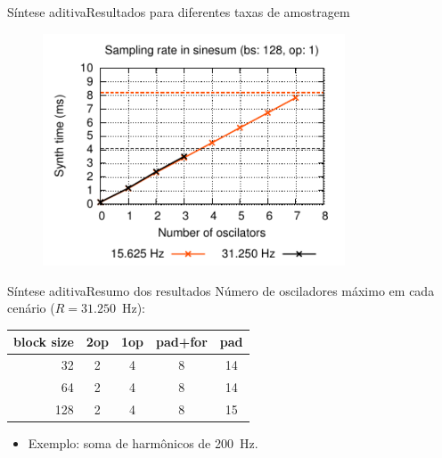 \begin{frame}{Síntese aditiva}{Resultados para diferentes taxas de amostragem}
\begin{figure}
\includegraphics[width=0.8\textwidth]{./img/frequencies-128-1.pdf}
\end{figure}
\end{frame}

\begin{frame}{Síntese aditiva}{Resumo dos resultados}
Número de osciladores máximo em cada cenário ($R=31.250$~Hz):
\begin{center}
\begin{tabular}{rcccc}
\toprule
\toprule
block size  & 2op & 1op & pad+for & pad \\
\midrule
32  & 2 & 4 & 8 & 14 \\
64  & 2 & 4 & 8 & 14 \\
128 & 2 & 4 & 8 & 15 \\
\bottomrule
\end{tabular}
\pause
\end{center}
\begin{itemize}
  \item Exemplo: soma de harmônicos de 200~Hz.
\end{itemize}
\end{frame}


